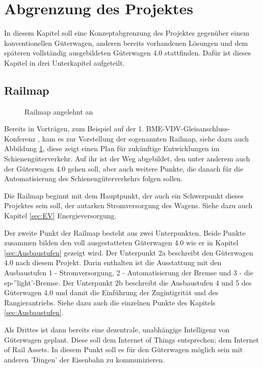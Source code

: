 \section{Abgrenzung des Projektes}
In diesem Kapitel soll eine Konzeptabgrenzung des Projektes gegenüber einem konventionellen Güterwagen, anderen bereits vorhandenen Lösungen und dem späteren vollständig ausgebildeten Güterwagen 4.0 stattfinden. Dafür ist dieses Kapitel in drei Unterkapitel aufgeteilt.

\subsection{Railmap}
\begin{figure}[hbp]
    \centering
    
    \caption{Railmap angelehnt an \cite{GAK}}
    \label{fig:Railmap}
\end{figure}
Bereits in Vorträgen, zum Beispiel auf der 1. BME-VDV-Gleisanschluss-Konferenz \cite{GAK}, kam es zur Vorstellung der sogenannten Railmap, siehe dazu auch Abbildung \ref{fig:Railmap}, diese zeigt einen Plan für zukünftige Entwicklungen im Schienengüterverkehr. Auf ihr ist der Weg abgebildet, den unter anderem auch der Güterwagen 4.0  gehen soll, aber auch weitere Punkte, die danach für die Automatisierung des Schienengüterverkehrs folgen sollen.\par
Die Railmap beginnt mit dem Hauptpunkt, der auch ein Schwerpunkt dieses Projektes sein soll, der autarken Stromversorgung des Wagens. Siehe dazu auch Kapitel \ref{sec:EV} Energieversorgung.\par
Der zweite Punkt der Railmap besteht aus zwei Unterpunkten. Beide Punkte zusammen bilden den voll ausgestatteten Güterwagen 4.0 wie er in Kapitel \ref{sec:Ausbaustufen} gezeigt wird. %
Der Unterpunkt 2a beschreibt den Güterwagen 4.0 nach diesem Projekt. Darin enthalten ist die Ausstattung mit den Ausbaustufen 1 - Stromversorgung, 2 - Automatisierung der Bremse und 3 - die ep-''light'-Bremse. %
Der Unterpunkt 2b beschreibt die Ausbaustufen 4 und 5 des Güterwagen 4.0 und damit die Einführung der Zugintigrität und des Rangierantriebs. %
Siehe dazu auch die einzelnen Punkte des Kapitels \ref{sec:Ausbaustufen}.\par
Als Drittes ist dann bereits eine dezentrale, unabhängige Intelligenz von Güterwagen geplant. Diese soll dem Internet of Things entsprechen; dem Internet of Rail Assets. In diesem Punkt soll es für den Güterwagen möglich sein mit anderen 'Dingen' der Eisenbahn zu kommunizieren.\par
